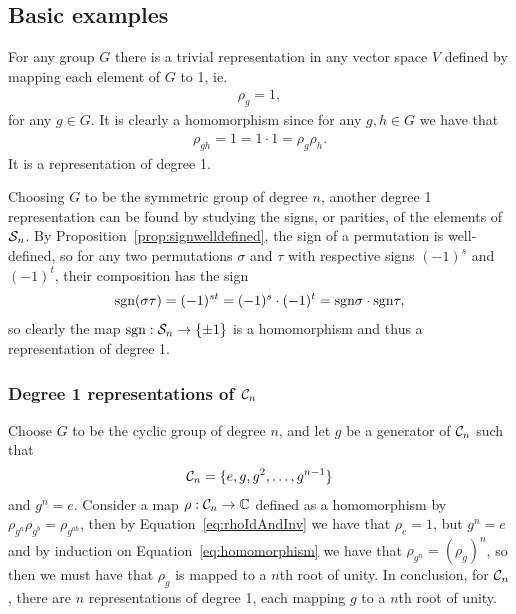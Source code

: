 \subsection{Basic examples}\label{sect:basicreprs}

\begin{example}
	For any group $G$ there is a trivial representation in any vector space $V$ defined by mapping each element of $G$ to 1, ie.
	\begin{align*}
		\rho_g = 1,
	\end{align*}
	for any $g \in G$. It is clearly a homomorphism since for any $g,h \in G$ we have that
	\begin{align*}
		\rho_{gh} = 1 = 1 \cdot 1 = \rho_g \rho_h.
	\end{align*}
	It is a representation of degree 1.
\end{example}

\begin{example}
	Choosing $G$ to be the symmetric group of degree $n$, another degree 1 representation can be found by studying the signs, or parities, of the elements of $\mathcal{S}_n$. By Proposition~\ref{prop:signwelldefined}, the sign of a permutation is well-defined, so for any two permutations $\sigma$ and $\tau$ with respective signs $(-1)^s$ and $(-1)^t$, their composition has the sign
	\begin{align*}
		\text{sgn}(\sigma\tau) = (-1)^{st} = (-1)^s \cdot (-1)^t = \text{sgn}\sigma \cdot \text{sgn} \tau,
	\end{align*}
	so clearly the map $\text{sgn}: \mathcal{S}_n \rightarrow \{\pm 1\}$ is a homomorphism and thus a representation of degree 1.
\end{example}

\subsubsection{Degree 1 representations of $\mathcal{C}_n$}\label{sect:deg1cycn}

Choose $G$ to be the cyclic group of degree $n$, and let $g$ be a generator of $\mathcal{C}_n$ such that 
\begin{align*}
	\mathcal{C}_n = \{ e, g, g^2, \dots, g^{n-1}\}
\end{align*}
and $g^n = e$. Consider a map $\rho: \mathcal{C}_n \rightarrow \mathbb{C}$ defined as a homomorphism by $\rho_{g^a}\rho_{g^b} = \rho_{g^{ab}}$, then by Equation~\ref{eq:rhoIdAndInv} we have that $\rho_e = 1$, but $g^n = e$ and by induction on Equation~\ref{eq:homomorphism} we have that $\rho_{g^n} = (\rho_g)^n$, so then we must have that $\rho_g$ is mapped to a $n$th root of unity.
In conclusion, for $\mathcal{C}_n$, there are $n$ representations of degree 1, each mapping $g$ to a $n$th root of unity.

